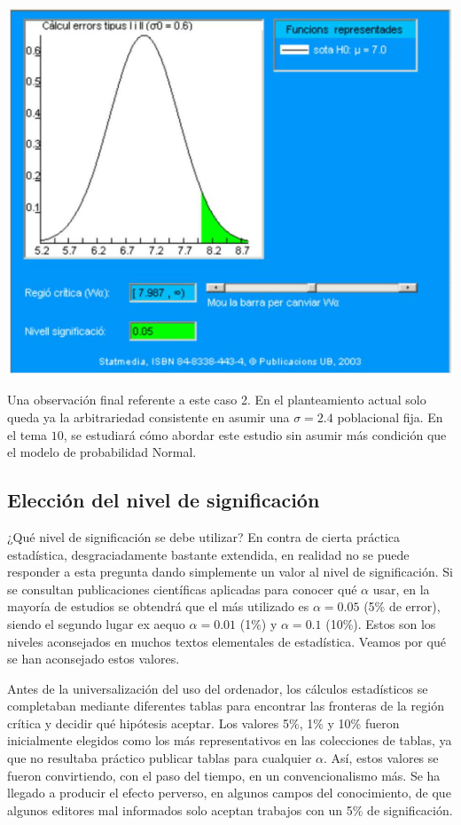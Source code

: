 \documentclass[
]{article}
\begin{document}
\begin{center}\includegraphics[width=0.9\linewidth]{images/cap9-PotenciaHipotesisComposta} \end{center}

Una observación final referente a este caso 2. En el planteamiento actual solo queda ya la arbitrariedad consistente en asumir una \(\sigma=2.4\) poblacional fija. En el tema \(10\), se estudiará cómo abordar este estudio sin asumir más condición que el modelo de probabilidad Normal.

\subsection{Elección del nivel de significación}\label{elecciuxf3n-del-nivel-de-significaciuxf3n}

¿Qué nivel de significación se debe utilizar? En contra de cierta práctica estadística, desgraciadamente bastante extendida, en realidad no se puede responder a esta pregunta dando simplemente un valor al nivel de significación. Si se consultan publicaciones científicas aplicadas para conocer qué \(\alpha\) usar, en la mayoría de estudios se obtendrá que el más utilizado es \(\alpha=0.05\) (5\% de error), siendo el segundo lugar ex aequo \(\alpha=0.01\) (1\%) y \(\alpha=0.1\) (10\%). Estos son los niveles aconsejados en muchos textos elementales de estadística. Veamos por qué se han aconsejado estos valores.

Antes de la universalización del uso del ordenador, los cálculos estadísticos se completaban mediante diferentes tablas para encontrar las fronteras de la región crítica y decidir qué hipótesis aceptar. Los valores 5\%, 1\% y 10\% fueron inicialmente elegidos como los más representativos en las colecciones de tablas, ya que no resultaba práctico publicar tablas para cualquier \(\alpha\). Así, estos valores se fueron convirtiendo, con el paso del tiempo, en un convencionalismo más. Se ha llegado a producir el efecto perverso, en algunos campos del conocimiento, de que algunos editores mal informados solo aceptan trabajos con un 5\% de significación.
\end{document}
